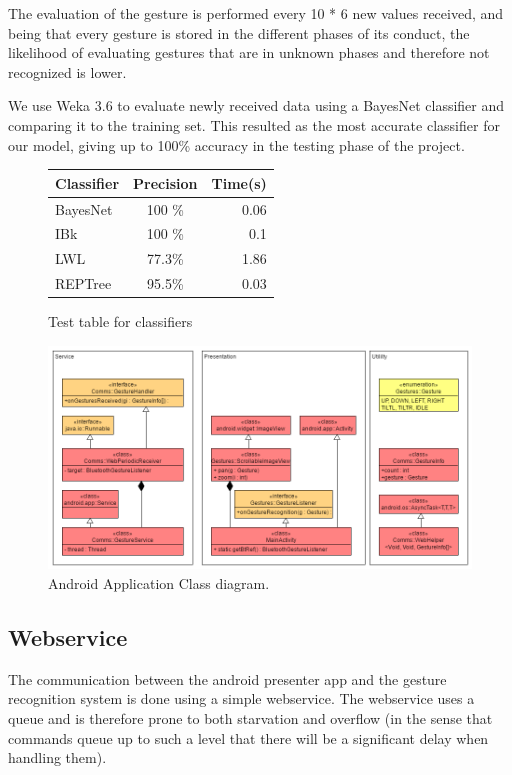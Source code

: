 The evaluation of the gesture is performed every 10 * 6 new values received,
 and being that every gesture is stored in the different phases of its conduct,
  the likelihood of evaluating gestures that are in unknown phases and therefore not recognized is lower.

We use Weka 3.6 to evaluate newly received data using a BayesNet classifier and comparing it to the training set. 
This resulted as the most accurate classifier for our model, giving up to 100\% accuracy in the testing phase of the project.

\begin{figure}[h]
\begin{center}
\begin{tabular}{ l  c r }
Classifier & Precision & Time(s)\\ [0.5ex]
\hline \hline
BayesNet & 100 \%  & 0.06\\ 
IBk & 100 \% & 0.1 \\
LWL & 77.3\%  & 1.86\\
REPTree & 95.5\%  & 0.03 \\ [1ex]
\end{tabular}
\end{center}
\caption{Test table for classifiers}
\label{fig:wekaclass}
\end{figure}

\begin{figure}[!h]
\centering
\includegraphics[width=1\columnwidth]{img/android_class_diagram}
\caption{Android Application Class diagram.}
\label{fig:and_class}
\end{figure}

\subsection{Webservice}
The communication between the android presenter app and the gesture recognition system is done using a simple webservice.
The webservice uses a queue and is therefore prone to both starvation and overflow
(in the sense that commands queue up to such a level that there will be a significant delay when handling them).


